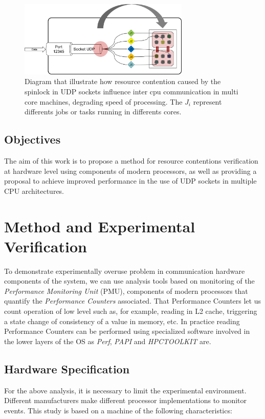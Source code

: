 \documentclass[journal]{IEEEtran}
\begin{document}
\begin{figure}[!h]
\centering
  \includegraphics[width=3.2in]{Imagenes/diagrama1}
  \caption{Diagram that illustrate how resource contention caused by the spinlock in UDP sockets influence inter cpu communication in multi core machines, degrading speed of processing. The $J_i$ represent differents jobs or tasks running in differents cores.}
  \label{fig:diag1}
\end{figure}

\subsection*{Objectives}
The aim of this work is to propose a method for resource contentions verification at hardware level using components of modern processors, as well as providing a proposal to achieve improved performance in the use of UDP sockets in multiple CPU architectures.



\section{Method and Experimental Verification}
To demonstrate experimentally overuse problem in communication hardware components of the system, we can use analysis tools based on monitoring of the \emph{Performance Monitoring Unit} (PMU), components of modern processors that quantify the \emph{Performance Counters} associated. That Performance Counters let us count operation of low level such as, for example, reading in L2 cache, triggering a state change of consistency of a value in memory, etc. In practice reading Performance Counters can be performed using specialized software involved in the lower layers of the OS as \emph{Perf}, \emph{PAPI} and \emph{HPCTOOLKIT} \cite{bib:hpc} are.

\subsection{Hardware Specification}
For the above analysis, it is necessary to limit the experimental environment. Different manufacturers make different processor implementations to monitor events. This study is based on a machine of the following characteristics:
\end{document}
